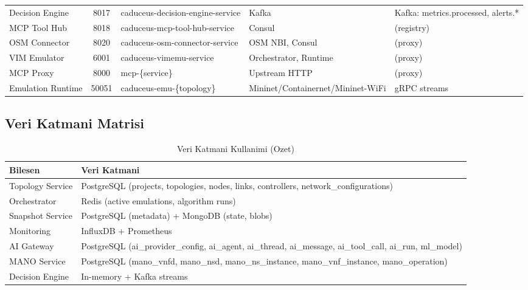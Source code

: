 \documentclass[conference]{IEEEtran}
\begin{document}
\begin{table}[t]
\begin{tabularx}{\textwidth}{l c l Y Y}
Decision Engine & 8017 & caduceus-decision-engine-service & Kafka & Kafka: metrics.processed, alerts.* \\
MCP Tool Hub & 8018 & caduceus-mcp-tool-hub-service & Consul & (registry) \\
OSM Connector & 8020 & caduceus-osm-connector-service & OSM NBI, Consul & (proxy) \\
VIM Emulator & 6001 & caduceus-vimemu-service & Orchestrator, Runtime & (proxy) \\
MCP Proxy & 8000 & mcp-\{service\} & Upstream HTTP & (proxy) \\
Emulation Runtime & 50051 & caduceus-emu-\{topology\} & Mininet/Containernet/Mininet-WiFi & gRPC streams \\
\bottomrule
\end{tabularx}
\end{table}

\subsection{Veri Katmani Matrisi}
\begin{table}[htbp]
\caption{Veri Katmani Kullanimi (Ozet)}
\label{tab:data_matrix}
\centering
\scriptsize
\begin{tabularx}{\linewidth}{l Y}
\toprule
Bilesen & Veri Katmani \\
\midrule
Topology Service & PostgreSQL (projects, topologies, nodes, links, controllers, network_configurations) \\
Orchestrator & Redis (active emulations, algorithm runs) \\
Snapshot Service & PostgreSQL (metadata) + MongoDB (state, blobs) \\
Monitoring & InfluxDB + Prometheus \\
AI Gateway & PostgreSQL (ai\_provider\_config, ai\_agent, ai\_thread, ai\_message, ai\_tool\_call, ai\_run, ml\_model) \\
MANO Service & PostgreSQL (mano\_vnfd, mano\_nsd, mano\_ns\_instance, mano\_vnf\_instance, mano\_operation) \\
Decision Engine & In-memory + Kafka streams \\
\bottomrule
\end{tabularx}
\end{table}
\end{document}

